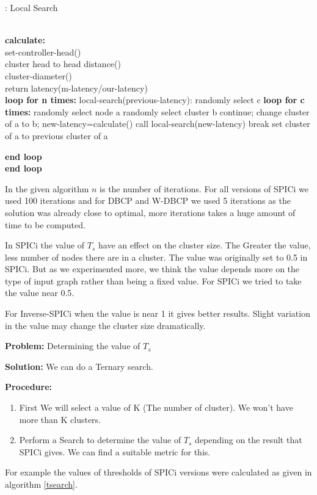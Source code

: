 \documentclass[10pt]{extarticle}
\begin{document}
	\begin{algorithm}
		\caption{: Local Search}\label{local}
		\begin{algorithmic}[1]
			 \\
			\textbf{calculate:} \\
			set-controller-head() \\
			cluster head to head distance() \\
			cluster-diameter() \\
			return latency(m-latency/our-latency) \\
			
			\textbf{loop for n times:}
			\State local-search(previous-latency):
			\State randomly select c
			\State \textbf{loop for c times:}
			\State randomly select node a
			\State randomly select cluster b
			 continue;
			\EndIf
			\State change cluster of a to b;
			\State new-latency=calculate()
			\State call local-search(new-latency)
			\State break
			\Else
			\State set cluster of a to previous cluster of a
			
			\EndIf
			\State \textbf{end loop} \\
			\textbf{end loop}
			\EndProcedure
		\end{algorithmic}
	\end{algorithm}
	In the given algorithm $n$ is the number of iterations. For all versions of SPICi we used 100 iterations and for DBCP and W-DBCP we used 5 iterations as the solution was already close to optimal, more iterations takes a huge amount of time to be computed.
	
	In SPICi the value of $T_s$ have an effect on the cluster size. The Greater the value, less number of nodes there are in a cluster. The value was originally set to 0.5 in SPICi.
	But as we experimented more, we think the value depends more on the type of input graph rather than being a fixed value. For SPICi we tried to take the value near 0.5.
	
	For Inverse-SPICi when the value is near 1 it gives better results. Slight variation in the value may change the cluster size dramatically. 
	
	\textbf{Problem:} Determining the value of $T_s$
	
	
	\textbf{Solution:} We can do a Ternary search.
	
	\textbf{Procedure:} 
	\begin{enumerate}
		\item First We will select a value of K (The number of cluster). We won't have more than K clusters.
		\item Perform a Search to determine the value of $T_s$ depending on the result that SPICi gives. We can find a suitable metric for this.
	\end{enumerate}
	For example the values of thresholds of SPICi versions were calculated as given in algorithm \ref{tsearch}.
	
\end{document}
